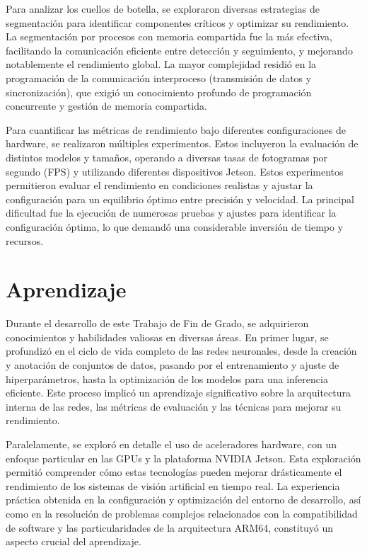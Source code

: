 \documentclass[11pt,spanish,listoffigures,listoftables]{tfgetsinf}
\begin{document}
Para analizar los cuellos de botella, se exploraron diversas estrategias de segmentación para identificar componentes críticos y optimizar su rendimiento. La segmentación por procesos con memoria compartida fue la más efectiva, facilitando la comunicación eficiente entre detección y seguimiento, y mejorando notablemente el rendimiento global. La mayor complejidad residió en la programación de la comunicación interproceso (transmisión de datos y sincronización), que exigió un conocimiento profundo de programación concurrente y gestión de memoria compartida.

Para cuantificar las métricas de rendimiento bajo diferentes configuraciones de hardware, se realizaron múltiples experimentos. Estos incluyeron la evaluación de distintos modelos y tamaños, operando a diversas tasas de fotogramas por segundo (FPS) y utilizando diferentes dispositivos Jetson. Estos experimentos permitieron evaluar el rendimiento en condiciones realistas y ajustar la configuración para un equilibrio óptimo entre precisión y velocidad. La principal dificultad fue la ejecución de numerosas pruebas y ajustes para identificar la configuración óptima, lo que demandó una considerable inversión de tiempo y recursos.
\section{Aprendizaje}

Durante el desarrollo de este Trabajo de Fin de Grado, se adquirieron conocimientos y habilidades valiosas en diversas áreas. En primer lugar, se profundizó en el ciclo de vida completo de las redes neuronales, desde la creación y anotación de conjuntos de datos, pasando por el entrenamiento y ajuste de hiperparámetros, hasta la optimización de los modelos para una inferencia eficiente. Este proceso implicó un aprendizaje significativo sobre la arquitectura interna de las redes, las métricas de evaluación y las técnicas para mejorar su rendimiento.

Paralelamente, se exploró en detalle el uso de aceleradores hardware, con un enfoque particular en las GPUs y la plataforma NVIDIA Jetson. Esta exploración permitió comprender cómo estas tecnologías pueden mejorar drásticamente el rendimiento de los sistemas de visión artificial en tiempo real. La experiencia práctica obtenida en la configuración y optimización del entorno de desarrollo, así como en la resolución de problemas complejos relacionados con la compatibilidad de software y las particularidades de la arquitectura ARM64, constituyó un aspecto crucial del aprendizaje.
\end{document}
